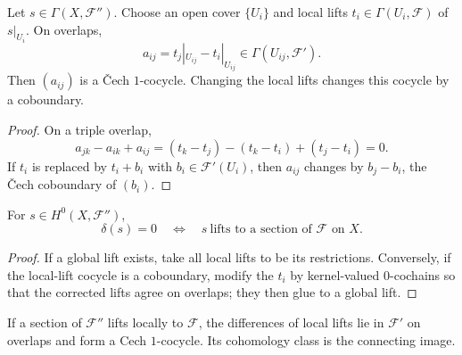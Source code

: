 
\begin{proposition}\label{prop:vi48-local-lift}
Let $s\in\Gamma(X,\mathcal F'')$.  Choose an open cover $\{U_i\}$ and local lifts $t_i\in\Gamma(U_i,\mathcal F)$ of $s|_{U_i}$.  On overlaps,
\[
a_{ij}=t_j|_{U_{ij}}-t_i|_{U_{ij}}\in\Gamma(U_{ij},\mathcal F').
\]
Then $(a_{ij})$ is a \v{C}ech $1$-cocycle.  Changing the local lifts changes this cocycle by a coboundary.
\begin{proof}
On a triple overlap,
\[
a_{jk}-a_{ik}+a_{ij}=(t_k-t_j)-(t_k-t_i)+(t_j-t_i)=0.
\]
If $t_i$ is replaced by $t_i+b_i$ with $b_i\in\mathcal F'(U_i)$, then $a_{ij}$ changes by $b_j-b_i$, the \v{C}ech coboundary of $(b_i)$.
\end{proof}
\end{proposition}

\begin{corollary}\label{cor:vi48-lift-criterion}
For $s\in H^0(X,\mathcal F'')$,
\[
\delta(s)=0
\quad\Longleftrightarrow\quad
s\ \text{lifts to a section of }\mathcal F\text{ on }X.
\]
\begin{proof}
If a global lift exists, take all local lifts to be its restrictions.  Conversely, if the local-lift cocycle is a coboundary, modify the $t_i$ by kernel-valued $0$-cochains so that the corrected lifts agree on overlaps; they then glue to a global lift.
\end{proof}
\end{corollary}

\begin{example}\label{ex:vi48-expand-02}
If a section of $\mathcal F''$ lifts locally to $\mathcal F$, the differences of local lifts lie in $\mathcal F'$ on overlaps and form a Cech $1$-cocycle.  Its cohomology class is the connecting image.
\end{example}
